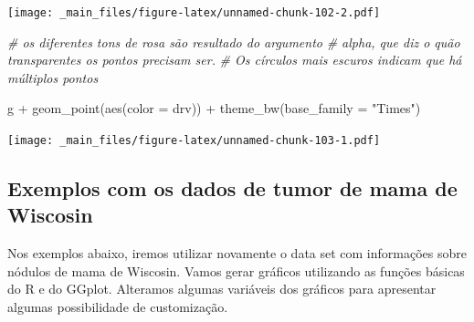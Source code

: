 \documentclass[
]{book}
\newenvironment{Shaded}{\begin{snugshade}}{\end{snugshade}}
\newcommand{\AttributeTok}[1]{\textcolor[rgb]{0.77,0.63,0.00}{#1}}
\newcommand{\CommentTok}[1]{\textcolor[rgb]{0.56,0.35,0.01}{\textit{#1}}}
\newcommand{\FunctionTok}[1]{\textcolor[rgb]{0.00,0.00,0.00}{#1}}
\newcommand{\NormalTok}[1]{#1}
\newcommand{\SpecialCharTok}[1]{\textcolor[rgb]{0.00,0.00,0.00}{#1}}
\newcommand{\StringTok}[1]{\textcolor[rgb]{0.31,0.60,0.02}{#1}}
\begin{document}
\texttt{[image: \_main\_files/figure-latex/unnamed-chunk-102-2.pdf]}

\begin{Shaded}
\begin{Highlighting}[]
\CommentTok{\# os diferentes tons de rosa são resultado do argumento}
\CommentTok{\# alpha, que diz o quão transparentes os pontos precisam ser.}
\CommentTok{\# Os círculos mais escuros indicam que há múltiplos pontos}
\end{Highlighting}
\end{Shaded}

\begin{Shaded}
\begin{Highlighting}[]
\NormalTok{g }\SpecialCharTok{+} \FunctionTok{geom\_point}\NormalTok{(}\FunctionTok{aes}\NormalTok{(}\AttributeTok{color =}\NormalTok{ drv)) }\SpecialCharTok{+} \FunctionTok{theme\_bw}\NormalTok{(}\AttributeTok{base\_family =} \StringTok{"Times"}\NormalTok{)}
\end{Highlighting}
\end{Shaded}

\texttt{[image: \_main\_files/figure-latex/unnamed-chunk-103-1.pdf]}

\hypertarget{exemplos-com-os-dados-de-tumor-de-mama-de-wiscosin}{%
\subsection{Exemplos com os dados de tumor de mama de Wiscosin}\label{exemplos-com-os-dados-de-tumor-de-mama-de-wiscosin}}

Nos exemplos abaixo, iremos utilizar novamente o data set com informações sobre nódulos de mama de Wiscosin. Vamos gerar gráficos utilizando as funções básicas do R e do GGplot. Alteramos algumas variáveis dos gráficos para apresentar algumas possibilidade de customização.
\end{document}
